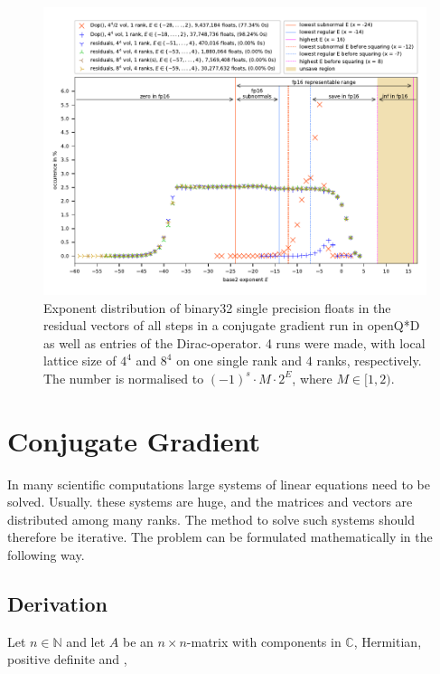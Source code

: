 \documentclass{article}
\theoremstyle{plain} %
\theoremstyle{convention} %
\theoremstyle{remark} %
\numberwithin{equation}{section}
\begin{document}
\begin{figure}
    \centering
    \includegraphics[width=1.0\textwidth]{plots/exponents_dirac}
    \caption{Exponent distribution of \gls{binary32} single precision floats in the residual vectors of all steps in a conjugate gradient run in openQ*D as well as entries of the Dirac-operator. 4 runs were made, with local lattice size of $4^4$ and $8^4$ on one single rank and $4$ ranks, respectively. The number is normalised to $(-1)^s \cdot M \cdot 2^{E}$, where $M \in [1, 2)$.}
    \label{fig:exponents}
\end{figure}


\section{Conjugate Gradient}

\label{sec:cg}

In many scientific computations large systems of linear equations need to be solved. Usually. these systems are huge, and the matrices and vectors are distributed among many \glspl{rank}. The method to solve such systems should therefore be iterative. The problem can be formulated mathematically in the following way.

\subsection{Derivation}

Let $n \in \mathbb{N}$ and let $A$ be an $n \times n$-matrix with components in $\mathbb{C}$, Hermitian, positive definite and ,
\end{document}
